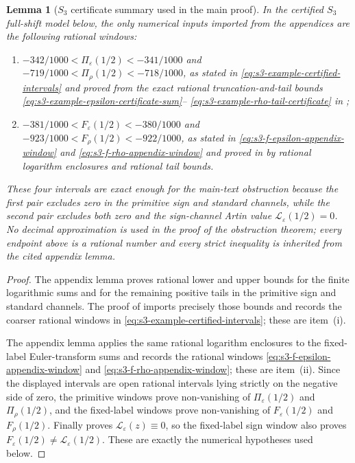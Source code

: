 \documentclass[11pt,a4paper]{amsart}
\theoremstyle{plain}
\newtheorem{lemma}[theorem]{Lemma}
\theoremstyle{definition}
\theoremstyle{remark}
\begin{document}
\begin{lemma}[\(S_3\) certificate summary used in the main proof]
  \label{lem:s3-main-text-certificate-summary}
  In the certified \(S_3\) full-shift model below, the only numerical
  inputs imported from the appendices are the following rational windows:
  \begin{enumerate}[label=\textup{(\roman*)},leftmargin=*]
    \item
    \(-342/1000<\Pi_\varepsilon(1/2)<-341/1000\) and
    \(-719/1000<\Pi_\rho(1/2)<-718/1000\), as stated in
    \eqref{eq:s3-example-certified-intervals} and proved from the exact
    rational truncation-and-tail bounds
    \eqref{eq:s3-example-epsilon-certificate-sum}--
    \eqref{eq:s3-example-rho-tail-certificate} in
    ;
    \item
    \(-381/1000<F_\varepsilon(1/2)<-380/1000\) and
    \(-923/1000<F_\rho(1/2)<-922/1000\), as stated in
    \eqref{eq:s3-f-epsilon-appendix-window} and
    \eqref{eq:s3-f-rho-appendix-window} and proved in
     by rational logarithm
    enclosures and rational tail bounds.
  \end{enumerate}
  These four intervals are exact enough for the main-text obstruction because
  the first pair excludes zero in the primitive sign and standard channels,
  while the second pair excludes both zero and the sign-channel Artin value
  \(\mathcal L_\varepsilon(1/2)=0\).  No decimal approximation is used in
  the proof of the obstruction theorem; every endpoint above is a rational
  number and every strict inequality is inherited from the cited appendix
  lemma.
\end{lemma}

\begin{proof}
  The appendix lemma
   proves rational lower and upper
  bounds for the finite logarithmic sums and for the remaining positive
  tails in the primitive sign and standard channels.  The proof of
   imports precisely those bounds
  and records the coarser rational windows in
  \eqref{eq:s3-example-certified-intervals}; these are item~\textup{(i)}.

  The appendix lemma
   applies the same rational
  logarithm enclosures to the fixed-label Euler-transform sums and records
  the rational windows
  \eqref{eq:s3-f-epsilon-appendix-window} and
  \eqref{eq:s3-f-rho-appendix-window}; these are item~\textup{(ii)}.  Since
  the displayed intervals are open rational intervals lying strictly on the
  negative side of zero, the primitive windows prove non-vanishing of
  \(\Pi_\varepsilon(1/2)\) and \(\Pi_\rho(1/2)\), and the fixed-label windows
  prove non-vanishing of \(F_\varepsilon(1/2)\) and
  \(F_\rho(1/2)\).  Finally  proves
  \(\mathcal L_\varepsilon(z)\equiv0\), so the fixed-label sign window also
  proves \(F_\varepsilon(1/2)\ne\mathcal L_\varepsilon(1/2)\).  These are
  exactly the numerical hypotheses used below.
\end{proof}
\end{document}
